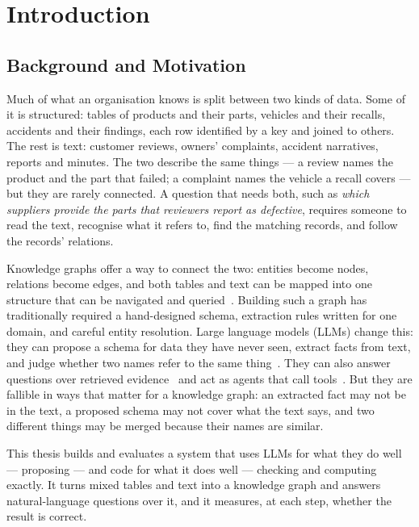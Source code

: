 \chapter{Introduction}\label{ch01}

\section{Background and Motivation}\label{sec:ch01-background-and-motivation}

Much of what an organisation knows is split between two kinds of data. Some of it is structured: tables of
products and their parts, vehicles and their recalls, accidents and their findings, each row identified by a key and
joined to others. The rest is text: customer reviews, owners' complaints, accident narratives, reports and minutes.
The two describe the same things --- a review names the product and the part that failed; a complaint names the
vehicle a recall covers --- but they are rarely connected. A question that needs both, such as \emph{which suppliers
provide the parts that reviewers report as defective}, requires someone to read the text, recognise what it refers
to, find the matching records, and follow the records' relations.

Knowledge graphs offer a way to connect the two: entities become nodes, relations become edges, and both tables and
text can be mapped into one structure that can be navigated and queried~\cite{hogan2021knowledge}. Building such a
graph has traditionally required a hand-designed schema, extraction rules written for one domain, and careful entity
resolution. Large language models (LLMs) change this: they can propose a schema for data they have never seen, extract
facts from text, and judge whether two names refer to the same thing~\cite{pan2024unifying,zhu2024llms}. They can
also answer questions over retrieved evidence~\cite{lewis2020retrieval} and act as agents that call
tools~\cite{yao2023react}. But they are fallible in ways that matter for a knowledge graph: an extracted fact may not
be in the text, a proposed schema may not cover what the text says, and two different things may be merged because
their names are similar.

This thesis builds and evaluates a system that uses LLMs for what they do well --- proposing --- and code for what it
does well --- checking and computing exactly. It turns mixed tables and text into a knowledge graph and answers
natural-language questions over it, and it measures, at each step, whether the result is correct.

